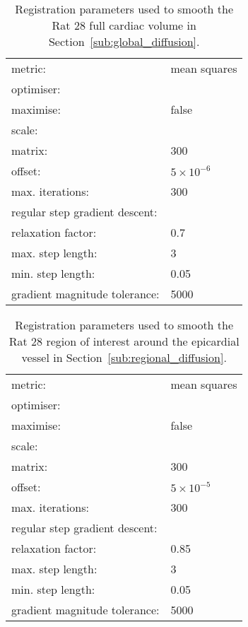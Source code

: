   \begin{table}[h]
    \centering
    \begin{tabular}{|ll|}
      \hline
      metric: & mean squares \\
      \multicolumn{2}{|l|}{optimiser:} \\
      \quad maximise: & false\\
      \multicolumn{2}{|l|}{\quad scale:} \\
      \quad\quad matrix: & 300 \\
      \quad\quad offset: & $5 \times 10^{-6}$ \\
      \quad max. iterations: & 300 \\
      \multicolumn{2}{|l|}{\quad regular step gradient descent:} \\
      \quad\quad relaxation factor: & 0.7 \\
      \quad\quad max. step length: & 3 \\
      \quad\quad min. step length: & 0.05 \\
      \quad\quad gradient magnitude tolerance: & 5000 \\
      \hline
    \end{tabular}
    
    \caption{Registration parameters used to smooth the Rat 28 full cardiac volume in Section~\ref{sub:global_diffusion}.}
    \label{tab:global_histo_to_histo}
  \end{table}
  
  \begin{table}[h]
    \centering
    \begin{tabular}{|ll|}
      \hline
      metric: & mean squares \\
      \multicolumn{2}{|l|}{optimiser:} \\
      \quad maximise: & false\\
      \multicolumn{2}{|l|}{\quad scale:} \\
      \quad\quad matrix: & 300 \\
      \quad\quad offset: & $5 \times 10^{-5}$\\
      \quad max. iterations: & 300 \\
      \multicolumn{2}{|l|}{\quad regular step gradient descent:} \\
      \quad\quad relaxation factor: & 0.85 \\
      \quad\quad max. step length: & 3 \\
      \quad\quad min. step length: & 0.05 \\
      \quad\quad gradient magnitude tolerance: & 5000 \\
      \hline
    \end{tabular}
    
    \caption{Registration parameters used to smooth the Rat 28 region of interest around the epicardial vessel in Section~\ref{sub:regional_diffusion}.}
    \label{tab:regional_histo_to_histo}
  \end{table}
